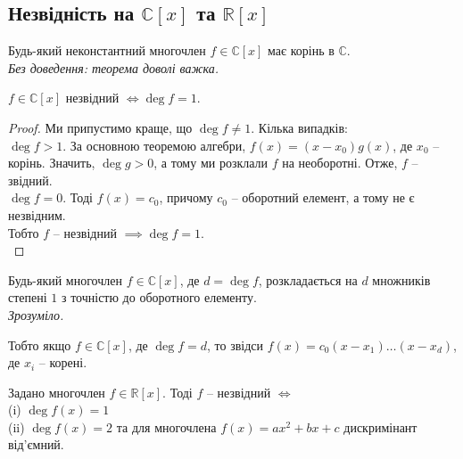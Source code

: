 \documentclass{math_library}
\begin{document}
\subsection{Незвідність на $\mathbb{C}[x]$ та $\mathbb{R}[x]$}
\begin{theorem}
Будь-який неконстантний многочлен $f \in \mathbb{C}[x]$ має корінь в $\mathbb{C}$.\\
\textit{Без доведення: теорема доволі важка.}
\end{theorem}

\begin{corollary}
$f \in \mathbb{C}[x]$ незвідний $\iff \deg f = 1$.
\end{corollary}

\begin{proof}
\rightproof Ми припустимо краще, що $\deg f \neq 1$. Кілька випадків: \\
$\deg f > 1$. За основною теоремою алгебри, $f(x) = (x-x_0)g(x)$, де $x_0$ -- корінь. Значить, $\deg g > 0$, а тому ми розклали $f$ на необоротні. Отже, $f$ -- звідний.\\
$\deg f = 0$. Тоді $f(x) = c_0$, причому $c_0$ -- оборотний елемент, а тому не є незвідним.\\
Тобто $f$ -- незвідний $\implies \deg f = 1$.
\bigskip \\
\leftproof {}
\end{proof}

\begin{corollary}
Будь-який многочлен $f \in \mathbb{C}[x]$, де $d = \deg f$, розкладається на $d$ множників степені $1$ з точністю до оборотного елементу.\\
\textit{Зрозуміло.}
\end{corollary}

Тобто якщо $f \in \mathbb{C}[x]$, де $\deg f = d$, то звідси $f(x) = c_0(x-x_1) \dots (x-x_d)$, де $x_i$ -- корені.

\begin{proposition}
Задано многочлен $f \in \mathbb{R}[x]$. Тоді $f$ -- незвідний $\iff$\\
(i) $\deg f(x) = 1$\\
(ii) $\deg f(x) = 2$ та для многочлена $f(x) = ax^2 + bx + c$ дискримінант від'ємний.
\end{proposition}
\end{document}
